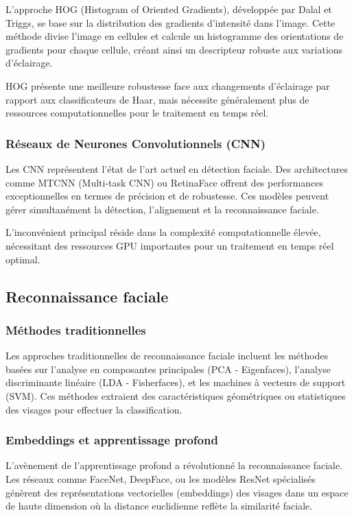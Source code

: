 \documentclass[12pt,a4paper]{article}
\begin{document}
L'approche HOG (Histogram of Oriented Gradients), développée par Dalal et Triggs, se base sur la distribution des gradients d'intensité dans l'image. Cette méthode divise l'image en cellules et calcule un histogramme des orientations de gradients pour chaque cellule, créant ainsi un descripteur robuste aux variations d'éclairage.

HOG présente une meilleure robustesse face aux changements d'éclairage par rapport aux classificateurs de Haar, mais nécessite généralement plus de ressources computationnelles pour le traitement en temps réel.

\subsubsection{Réseaux de Neurones Convolutionnels (CNN)}

Les CNN représentent l'état de l'art actuel en détection faciale. Des architectures comme MTCNN (Multi-task CNN) ou RetinaFace offrent des performances exceptionnelles en termes de précision et de robustesse. Ces modèles peuvent gérer simultanément la détection, l'alignement et la reconnaissance faciale.

L'inconvénient principal réside dans la complexité computationnelle élevée, nécessitant des ressources GPU importantes pour un traitement en temps réel optimal.

\subsection{Reconnaissance faciale}

\subsubsection{Méthodes traditionnelles}

Les approches traditionnelles de reconnaissance faciale incluent les méthodes basées sur l'analyse en composantes principales (PCA - Eigenfaces), l'analyse discriminante linéaire (LDA - Fisherfaces), et les machines à vecteurs de support (SVM). Ces méthodes extraient des caractéristiques géométriques ou statistiques des visages pour effectuer la classification.

\subsubsection{Embeddings et apprentissage profond}

L'avènement de l'apprentissage profond a révolutionné la reconnaissance faciale. Les réseaux comme FaceNet, DeepFace, ou les modèles ResNet spécialisés génèrent des représentations vectorielles (embeddings) des visages dans un espace de haute dimension où la distance euclidienne reflète la similarité faciale.
\end{document}
